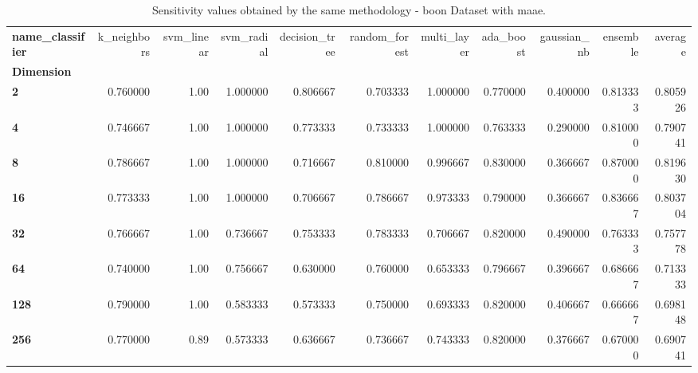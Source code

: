 \begin{table}
\centering
\caption{Sensitivity values obtained by the same methodology - boon Dataset with maae.}
\label{sensitivity_boon_maae-reproduction}
\begin{tabular}{lrrrrrrrrrr}
\toprule
\textbf{name\_classifier} &  k\_neighbors &  svm\_linear &  svm\_radial &  decision\_tree &  random\_forest &  multi\_layer &  ada\_boost &  gaussian\_nb &  ensemble &   average \\
\textbf{Dimension} &              &             &             &                &                &              &            &              &           &           \\
\midrule
\textbf{2        } &     0.760000 &        1.00 &    1.000000 &       0.806667 &       0.703333 &     1.000000 &   0.770000 &     0.400000 &  0.813333 &  0.805926 \\
\textbf{4        } &     0.746667 &        1.00 &    1.000000 &       0.773333 &       0.733333 &     1.000000 &   0.763333 &     0.290000 &  0.810000 &  0.790741 \\
\textbf{8        } &     0.786667 &        1.00 &    1.000000 &       0.716667 &       0.810000 &     0.996667 &   0.830000 &     0.366667 &  0.870000 &  0.819630 \\
\textbf{16       } &     0.773333 &        1.00 &    1.000000 &       0.706667 &       0.786667 &     0.973333 &   0.790000 &     0.366667 &  0.836667 &  0.803704 \\
\textbf{32       } &     0.766667 &        1.00 &    0.736667 &       0.753333 &       0.783333 &     0.706667 &   0.820000 &     0.490000 &  0.763333 &  0.757778 \\
\textbf{64       } &     0.740000 &        1.00 &    0.756667 &       0.630000 &       0.760000 &     0.653333 &   0.796667 &     0.396667 &  0.686667 &  0.713333 \\
\textbf{128      } &     0.790000 &        1.00 &    0.583333 &       0.573333 &       0.750000 &     0.693333 &   0.820000 &     0.406667 &  0.666667 &  0.698148 \\
\textbf{256      } &     0.770000 &        0.89 &    0.573333 &       0.636667 &       0.736667 &     0.743333 &   0.820000 &     0.376667 &  0.670000 &  0.690741 \\
\bottomrule
\end{tabular}
\end{table}
